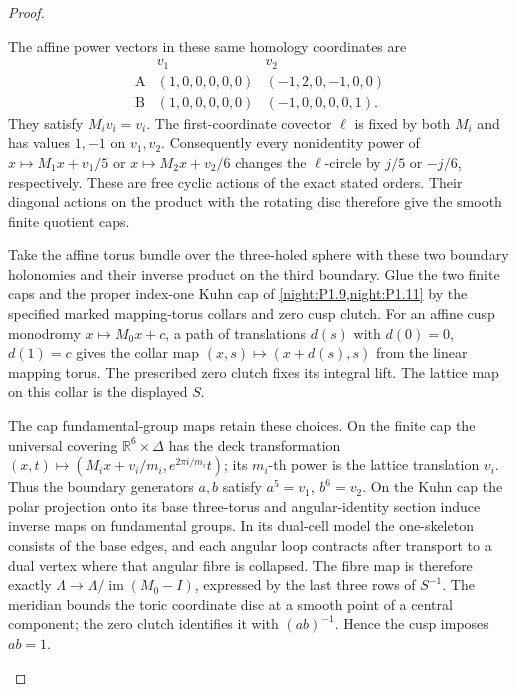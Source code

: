 \documentclass[11pt,a4paper]{article}
\numberwithin{equation}{section}
\theoremstyle{definition}
\begin{document}
\begin{proof}
\begin{enumerate}[label=\arabic*.]
The affine power vectors in these same homology coordinates are
\[
\begin{array}{c|cc}
 &v_1&v_2\\\hline
 \mathrm A&(1,0,0,0,0,0)&(-1,2,0,-1,0,0)\\
 \mathrm B&(1,0,0,0,0,0)&(-1,0,0,0,0,1).
\end{array}
\]
They satisfy $M_iv_i=v_i$. The first-coordinate covector
$\ell$ is fixed by both $M_i$ and has values $1,-1$ on $v_1,v_2$.
Consequently every nonidentity power of
$x\mapsto M_1x+v_1/5$ or $x\mapsto M_2x+v_2/6$ changes the
$\ell$-circle by $j/5$ or $-j/6$, respectively. These are free
cyclic actions of the exact stated orders. Their diagonal actions
on the product with the rotating disc therefore give the smooth finite quotient caps.

Take the affine torus bundle over the three-holed sphere with these
two boundary holonomies and their inverse product on the third
boundary. Glue the two finite caps and the proper index-one Kuhn
cap of \cref{night:P1.9,night:P1.11} by the
specified marked mapping-torus collars and zero cusp clutch.
For an affine cusp monodromy $x\mapsto M_0x+c$, a path of translations
$d(s)$ with $d(0)=0$, $d(1)=c$ gives the collar map
$(x,s)\mapsto(x+d(s),s)$ from the linear mapping torus. The prescribed
zero clutch fixes its integral lift. The lattice map on this collar
is the displayed $S$.

The cap fundamental-group maps retain these choices. On the finite
cap the universal covering $\mathbb R^6\times\Delta$ has the deck
transformation
$(x,t)\mapsto(M_ix+v_i/m_i,e^{2\pi i/m_i}t)$; its $m_i$-th power
is the lattice translation $v_i$. Thus the boundary generators
$a,b$ satisfy $a^5=v_1$, $b^6=v_2$. On the Kuhn cap the polar
projection onto its base three-torus and angular-identity section
induce inverse maps on fundamental groups. In its dual-cell model
the one-skeleton consists of the base edges, and each angular loop
contracts after transport to a dual vertex where that angular
fibre is collapsed. The fibre map is therefore exactly
$\Lambda\to\Lambda/\operatorname{im}(M_0-I)$, expressed by the last
three rows of $S^{-1}$. The meridian bounds the toric coordinate
disc at a smooth point of a central component; the zero clutch
identifies it with $(ab)^{-1}$. Hence the cusp imposes $ab=1$.


\end{enumerate}
\end{proof}
\end{document}
